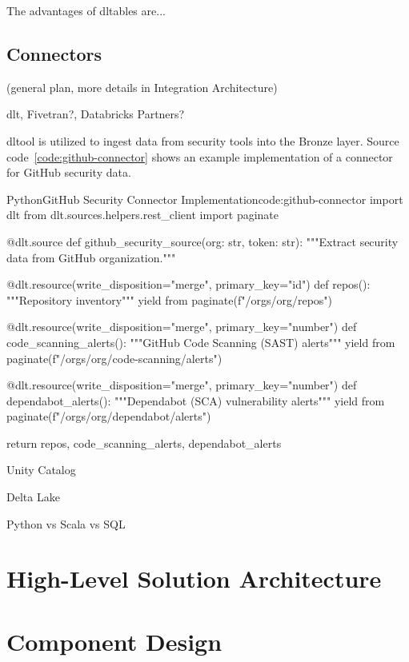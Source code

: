 The advantages of \gls{dltables} are...

\subsection{Connectors}

(general plan, more details in Integration Architecture)

dlt, Fivetran?, Databricks Partners?

\gls{dltool} is utilized to ingest data from security tools into the Bronze layer. Source code~\ref{code:github-connector} shows an example implementation of a connector for GitHub security data.

\begin{code}{Python}{GitHub Security Connector Implementation}{code:github-connector}
import dlt
from dlt.sources.helpers.rest_client import paginate

@dlt.source
def github_security_source(org: str, token: str):
    """Extract security data from GitHub organization."""

    @dlt.resource(write_disposition="merge", primary_key="id")
    def repos():
        """Repository inventory"""
        yield from paginate(f"/orgs/{org}/repos")

    @dlt.resource(write_disposition="merge", primary_key="number")
    def code_scanning_alerts():
        """GitHub Code Scanning (SAST) alerts"""
        yield from paginate(f"/orgs/{org}/code-scanning/alerts")

    @dlt.resource(write_disposition="merge", primary_key="number")
    def dependabot_alerts():
        """Dependabot (SCA) vulnerability alerts"""
        yield from paginate(f"/orgs/{org}/dependabot/alerts")

    return repos, code_scanning_alerts, dependabot_alerts
\end{code}

Unity Catalog

Delta Lake

Python vs Scala vs SQL


\section{High-Level Solution Architecture}


\section{Component Design}

